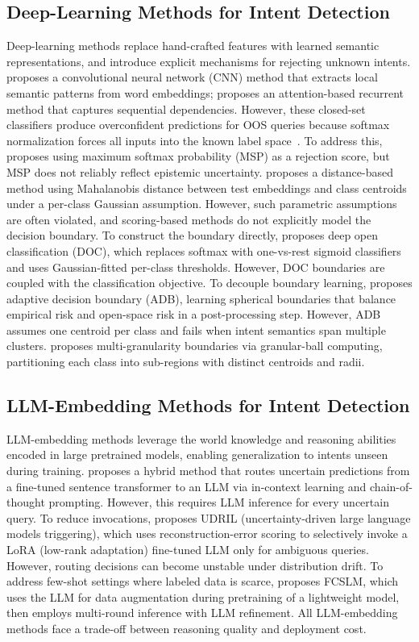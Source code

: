\subsection{Deep-Learning Methods for Intent Detection}
Deep-learning methods replace hand-crafted features with learned semantic representations, and introduce explicit mechanisms for rejecting unknown intents.
\citet{kim2014convolutional} proposes a convolutional neural network (CNN) method that extracts local semantic patterns from word embeddings; \citet{liu2016attention} proposes an attention-based recurrent method that captures sequential dependencies.
However, these closed-set classifiers produce overconfident predictions for OOS queries because softmax normalization forces all inputs into the known label space~\citep{hendrycks2017baseline}.
To address this, \citet{hendrycks2017baseline} proposes using maximum softmax probability (MSP) as a rejection score, but MSP does not reliably reflect epistemic uncertainty.
\citet{lee2018simple} proposes a distance-based method using Mahalanobis distance between test embeddings and class centroids under a per-class Gaussian assumption.
However, such parametric assumptions are often violated, and scoring-based methods do not explicitly model the decision boundary.
To construct the boundary directly, \citet{shu2017doc} proposes deep open classification (DOC), which replaces softmax with one-vs-rest sigmoid classifiers and uses Gaussian-fitted per-class thresholds.
However, DOC boundaries are coupled with the classification objective.
To decouple boundary learning, \citet{zhang2021adaptive} proposes adaptive decision boundary (ADB), learning spherical boundaries that balance empirical risk and open-space risk in a post-processing step.
However, ADB assumes one centroid per class and fails when intent semantics span multiple clusters.
\citet{li2025multi} proposes multi-granularity boundaries via granular-ball computing, partitioning each class into sub-regions with distinct centroids and radii.

\subsection{LLM-Embedding Methods for Intent Detection}
LLM-embedding methods leverage the world knowledge and reasoning abilities encoded in large pretrained models, enabling generalization to intents unseen during training.
\citet{arora2024intent} proposes a hybrid method that routes uncertain predictions from a fine-tuned sentence transformer to an LLM via in-context learning and chain-of-thought prompting.
However, this requires LLM inference for every uncertain query.
To reduce invocations, \citet{zaera2025efficient} proposes UDRIL (uncertainty-driven large language models triggering), which uses reconstruction-error scoring to selectively invoke a LoRA (low-rank adaptation) fine-tuned LLM only for ambiguous queries.
However, routing decisions can become unstable under distribution drift.
To address few-shot settings where labeled data is scarce, \citet{chen2025collaborating} proposes FCSLM, which uses the LLM for data augmentation during pretraining of a lightweight model, then employs multi-round inference with LLM refinement.
All LLM-embedding methods face a trade-off between reasoning quality and deployment cost.
